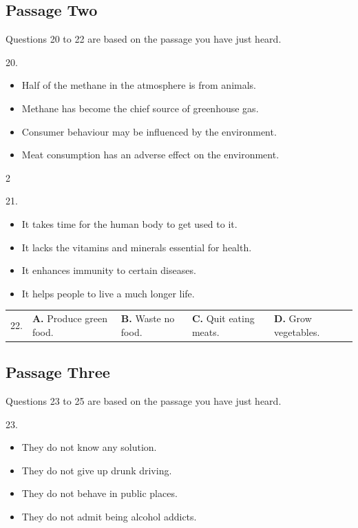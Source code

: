 \documentclass[UTF8,11pt]{ctexart}
\begin{document}
\subsection*{Passage Two}


Questions 20 to 22 are based on the passage you have just heard.


20.


\begin{itemize}[leftmargin=2em,itemsep=.2em,topsep=.4em]\item[A.] Half of the methane in the atmosphere is from animals.
\item[B.] Methane has become the chief source of greenhouse gas.
\item[C.] Consumer behaviour may be influenced by the environment.
\item[D.] Meat consumption has an adverse effect on the environment.
\end{itemize}

2


21.


\begin{itemize}[leftmargin=2em,itemsep=.2em,topsep=.4em]\item[A.] It takes time for the human body to get used to it.
\item[B.] It lacks the vitamins and minerals essential for health.
\item[C.] It enhances immunity to certain diseases.
\item[D.] It helps people to live a much longer life.
\end{itemize}

\noindent\begin{tabularx}{\linewidth}{@{}lXXXX@{}}22. & \textbf{A.} Produce green food. & \textbf{B.} Waste no food. & \textbf{C.} Quit eating meats. & \textbf{D.} Grow vegetables.\\\end{tabularx}\par

\subsection*{Passage Three}


Questions 23 to 25 are based on the passage you have just heard.


23.


\begin{itemize}[leftmargin=2em,itemsep=.2em,topsep=.4em]\item[A.] They do not know any solution.
\item[B.] They do not give up drunk driving.
\item[C.] They do not behave in public places.
\item[D.] They do not admit being alcohol addicts.
\end{itemize}
\end{document}

